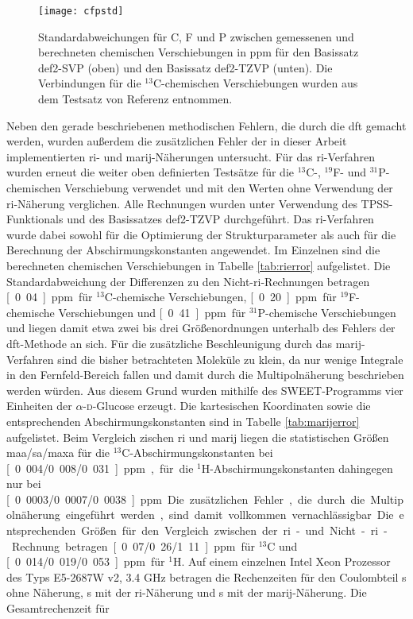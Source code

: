 \begin{figure}[ht!]
	\centering
	\texttt{[image: cfpstd]}
	\captionsetup{figurewithin = chapter}
	\captionsetup{font=small, labelfont=bf}\caption[Standardabweichungen für $^{13}$C-, $^{19}$F- und $^{31}$P-chemische Verschiebungen mit unterschiedliche Funktionalen und Basissätzen]{Standardabweichungen für C, F und P zwischen gemessenen und berechneten chemischen Verschiebungen in ppm für den Basissatz def2-SVP (oben) und den Basissatz def2-TZVP (unten). Die Verbindungen für die $^{13}$C-chemischen Verschiebungen wurden aus dem Testsatz von Referenz \cite{gauss1993effects} entnommen.} 
\label{abb:cfpshifts}
\end{figure}

\FloatBarrier
Neben den gerade beschriebenen methodischen Fehlern, die durch die \ac{dft} gemacht werden, wurden außerdem die zusätzlichen Fehler der in dieser Arbeit implementierten \ac{ri}- und \ac{marij}-Näherungen untersucht. Für das \ac{ri}-Verfahren wurden erneut die weiter oben definierten Testsätze für die $^{13}$C-, $^{19}$F- und $^{31}$P-chemischen Verschiebung verwendet und mit den Werten ohne Verwendung der \ac{ri}-Näherung verglichen. Alle Rechnungen wurden unter Verwendung des TPSS-Funktionals und des Basissatzes def2-TZVP durchgeführt. Das \ac{ri}-Verfahren wurde dabei sowohl für die Optimierung der Strukturparameter als auch für die Berechnung der Abschirmungskonstanten angewendet. Im Einzelnen sind die berechneten chemischen Verschiebungen in Tabelle \ref{tab:rierror} aufgelistet. Die Standardabweichung der Differenzen zu den Nicht-\ac{ri}-Rechnungen betragen \unit[0.04]{ppm} für $^{13}$C-chemische Verschiebungen, \unit[0.20]{ppm} für $^{19}$F-chemische Verschiebungen und \unit[0.41]{ppm} für $^{31}$P-chemische Verschiebungen und liegen damit etwa zwei bis drei Größenordnungen unterhalb des Fehlers der \ac{dft}-Methode an sich. Für die zusätzliche Beschleunigung durch das \ac{marij}-Verfahren sind die bisher betrachteten Moleküle zu klein, da nur wenige Integrale in den Fernfeld-Bereich fallen und damit durch die Multipolnäherung beschrieben werden würden. Aus diesem Grund wurden mithilfe des SWEET-Programms\supercite{bohne1999sweet} vier Einheiten der $\alpha$-\textsc{d}-Glucose erzeugt. Die kartesischen Koordinaten sowie die entsprechenden Abschirmungskonstanten sind in Tabelle \ref{tab:marijerror} aufgelistet. Beim Vergleich zischen \ac{ri} und \ac{marij} liegen die statistischen Größen \ac{maa}/\ac{sa}/\ac{maxa} für die $^{13}$C-Abschirmungskonstanten bei \unit[0.004/0.008/0.031]{ppm}, für die $^{1}$H-Abschirmungskonstanten dahingegen nur bei \unit[0.0003/0.0007/0.0038]{ppm}. Die zusätzlichen Fehler, die durch die Multipolnäherung eingeführt werden, sind damit vollkommen vernachlässigbar. Die entsprechenden Größen für den Vergleich zwischen der \ac{ri}- und Nicht-\ac{ri}-Rechnung betragen \unit[0.07/0.26/1.11]{ppm} für $^{13}$C und \unit[0.014/0.019/0.053]{ppm} für $^{1}$H. Auf einem einzelnen Intel\textsuperscript{\textregistered} Xeon\textsuperscript{\textregistered} Prozessor des Typs E5-2687W v2, 3.4 GHz betragen die Rechenzeiten für den Coulombteil \unit[4099]{s} ohne Näherung, \unit[220]{s} mit der \ac{ri}-Näherung und \unit[117]{s} mit der \ac{marij}-Näherung. Die Gesamtrechenzeit für 